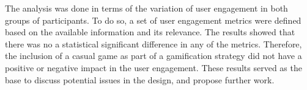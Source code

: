 The analysis was done in terms of the variation of user engagement in both groups of participants. To do so, a set of user engagement metrics were defined based on the available information and its relevance. The results showed that there was no a statistical significant difference in any of the metrics. Therefore, the inclusion of a casual game as part of a gamification strategy did not have a positive or negative impact in the user engagement. These results served as the base to discuss potential issues in the design, and propose further work.